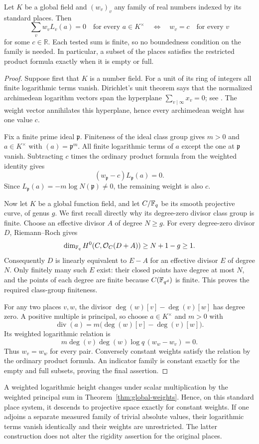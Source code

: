 \begin{theorem}\label{thm:global-weights}
Let $K$ be a global field and $(w_v)_v$ any family of real numbers indexed
by its standard places. Then
\[
 \sum_v w_vL_v(a)=0\quad\text{for every }a\in K^\times
 \quad\Longleftrightarrow\quad
 w_v=c\quad\text{for every }v
\]
for some $c\in\mathbb R$. Each tested sum is finite, so no boundedness
condition on the family is needed. In particular, a subset of the places
satisfies the restricted product formula exactly when it is empty or full.
\end{theorem}
\begin{proof}
Suppose first that $K$ is a number field. For a unit of its ring of
integers all finite logarithmic terms vanish. Dirichlet's unit theorem
says that the normalized archimedean logarithm vectors span the hyperplane
$\sum_{v\mid\infty}x_v=0$; see \citet[Theorem 5.9]{MilneANT}.
The weight vector annihilates this hyperplane, hence every archimedean
weight has one value $c$.

Fix a finite prime ideal $\mathfrak p$. Finiteness of the ideal class group
\citep[Theorem 4.4]{MilneANT} gives $m>0$ and $a\in K^\times$ with
$(a)=\mathfrak p^m$. All finite logarithmic terms of $a$ except the one at
$\mathfrak p$ vanish. Subtracting $c$ times the ordinary product formula
from the weighted identity gives
\[
 (w_{\mathfrak p}-c)L_{\mathfrak p}(a)=0.
\]
Since $L_{\mathfrak p}(a)=-m\log N(\mathfrak p)\ne0$, the remaining
weight is also $c$.

Now let $K$ be a global function field, and let $C/\mathbb F_q$ be its smooth
projective curve, of genus $g$. We first recall directly why its
degree-zero divisor class group is finite. Choose an effective divisor
$A$ of degree $N\ge g$. For every degree-zero divisor $D$, Riemann--Roch
\citep[Tag 0B5B, Section 53.5]{StacksRR} gives
\[
 \dim_{\mathbb F_q}H^0(C,\mathcal O_C(D+A))\ge N+1-g\ge1.
\]
Consequently $D$ is linearly equivalent to $E-A$ for an effective divisor
$E$ of degree $N$. Only finitely many such $E$ exist: their closed points
have degree at most $N$, and the points of each degree are finite because
$C(\mathbb F_{q^d})$ is finite. This proves the required class-group finiteness.

For any two places $v,w$, the divisor
$\deg(w)[v]-\deg(v)[w]$ has degree zero. A positive multiple is principal,
so choose $a\in K^\times$ and $m>0$ with
\[
 \operatorname{div}(a)
 =m\bigl(\deg(w)[v]-\deg(v)[w]\bigr).
\]
Its weighted logarithmic relation is
\[
 m\deg(v)\deg(w)\log q\,(w_w-w_v)=0.
\]
Thus $w_v=w_w$ for every pair. Conversely constant weights satisfy the
relation by the ordinary product formula. An indicator family is constant
exactly for the empty and full subsets, proving the final assertion.
\end{proof}

A weighted logarithmic height changes under scalar multiplication by the
weighted principal sum in Theorem~\ref{thm:global-weights}. Hence, on this
standard place system, it descends to projective space exactly for
constant weights. If one adjoins a separate measured family of trivial
absolute values, their logarithmic terms vanish identically and their
weights are unrestricted. The latter construction does not alter the
rigidity assertion for the original places.
